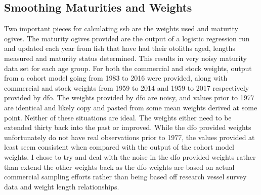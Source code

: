 \documentclass[11pt]{article}\usepackage[]{graphicx}\usepackage[]{color}
\begin{document}
\begin{table}[]
\centering
{}
\caption{The periods for landing bounds provided by Danny Ings, along with the description of how they relate and three sets of different upper and lower bound multipliers to be tested on \acrshort{spam}.}
\label{landTable}
\end{table}

\subsection{Smoothing Maturities and Weights}

Two important pieces for calculating \acrshort{ssb} are the weights used and maturity ogives. The maturity ogives provided are the output of a logistic regression run and updated each year from fish that have had their otoliths aged, lengths measured and maturity status determined. This results in very noisy maturity data set for each age group. For both the commercial and stock weights, output from a cohort model going from 1983 to 2016 were provided, along with commercial and stock weights from 1959 to 2014 and 1959 to 2017 respectively provided by \acrshort{dfo}. The weights provided by \acrshort{dfo} are noisy, and values prior to 1977 are identical and likely copy and pasted from some mean weights derived at some point. Neither of these situations are ideal. The weights either need to be extended thirty back into the past or improved. While the \acrshort{dfo} provided weights unfortunately do not have real observations prior to 1977, the values provided at least seem consistent when compared with the output of the cohort model weights. I chose to try and deal with the noise in the \acrshort{dfo} provided weights rather than extend the other weights back as the \acrshort{dfo} weights are based on actual commercial sampling efforts rather than being based off research vessel survey data and weight length relationships.
\end{document}
